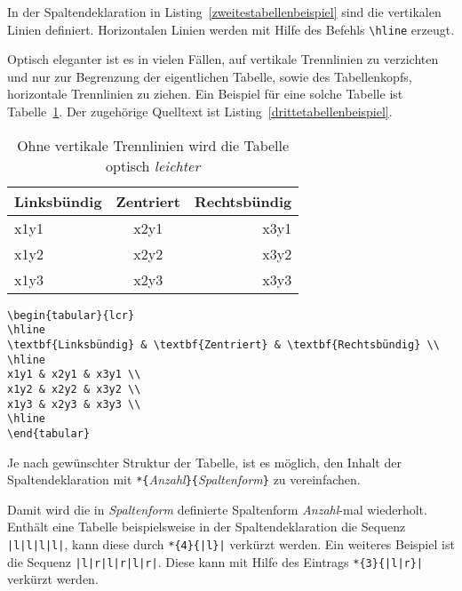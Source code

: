 In der Spaltendeklaration in Listing~\ref{zweitestabellenbeispiel} sind die vertikalen Linien definiert.
Horizontalen Linien werden mit Hilfe des Befehls \verb!\hline! erzeugt.

Optisch eleganter ist es in vielen Fällen, auf vertikale Trennlinien zu verzichten und
nur zur Begrenzung der eigentlichen Tabelle, sowie des Tabellenkopfs, horizontale Trennlinien zu ziehen. 
Ein Beispiel für eine solche Tabelle ist Tabelle~\ref{Tabelle_Spaltenformatierungseintrag3}. Der zugehörige Quelltext ist Listing~\ref{drittetabellenbeispiel}. 



\begin{table}[h!tb]
\centering
\caption{Ohne vertikale Trennlinien wird die Tabelle optisch \emph{leichter}}
\label{Tabelle_Spaltenformatierungseintrag3}
\begin{tabular}{lcr}
\hline
\textbf{Linksbündig} & \textbf{Zentriert} & \textbf{Rechtsbündig} \\
\hline
x1y1 & x2y1 & x3y1 \\
x1y2 & x2y2 & x3y2 \\
x1y3 & x2y3 & x3y3 \\
\hline
\end{tabular}
\end{table}



\begin{lstlisting}[caption={Ohne vertikale Trennlinien wird die Tabelle optisch \emph{leichter}},label=drittetabellenbeispiel, style=customlatex]
\begin{tabular}{lcr}
\hline
\textbf{Linksbündig} & \textbf{Zentriert} & \textbf{Rechtsbündig} \\
\hline
x1y1 & x2y1 & x3y1 \\
x1y2 & x2y2 & x3y2 \\
x1y3 & x2y3 & x3y3 \\
\hline
\end{tabular}
\end{lstlisting}

Je nach gewünschter Struktur der Tabelle, ist es möglich, den Inhalt der Spaltendeklaration mit 
\verb!*{!\textsl{Anzahl}\verb!}{!\textsl{Spaltenform}\verb!}! zu vereinfachen.

Damit wird die in \textsl{Spaltenform} definierte
Spaltenform \textsl{Anzahl}-mal wiederholt. Enthält eine Tabelle beispielsweise in der Spaltendeklaration die Sequenz \verb!|l|l|l|l|!, kann diese durch \verb!*{4}{|l}|! verkürzt werden. Ein weiteres Beispiel ist die Sequenz \verb!|l|r|l|r|l|r|!. Diese kann mit Hilfe des Eintrags \verb!*{3}{|l|r}|! verkürzt werden.


